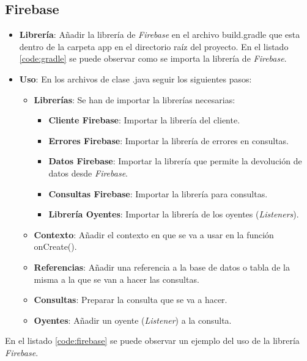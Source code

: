 	
	\newpage
	\subsection{Firebase}
	\begin{itemize}
		\item {\bf Librería}: Añadir la librería de {\it Firebase} en el archivo {\ttfamily build.gradle} que esta dentro de la carpeta {\ttfamily app} en el directorio raíz del proyecto. En el listado \ref{code:gradle} se puede observar como se importa la librería de {\it Firebase}.
		
		
		
		\item {\bf Uso}: En los archivos de clase {\ttfamily .java}\cite{14:java:online} seguir los siguientes pasos:
		\begin{itemize}
			\item {\bf Librerías}: Se han de importar la librerías necesarias:
			\begin{itemize}
				\item {\bf Cliente Firebase}: Importar la librería del cliente.
				\item {\bf Errores Firebase}: Importar la librería de errores en consultas.
				\item {\bf Datos Firebase}: Importar la librería que permite la devolución de datos desde {\it Firebase}.
				\item {\bf Consultas Firebase}: Importar la librería para consultas.
				\item {\bf Librería Oyentes}: Importar la librería de los oyentes ({\it Listeners}).
			\end{itemize}
			\item {\bf Contexto}: Añadir el contexto en que se va a usar en la función {\ttfamily onCreate()}.
			\item {\bf Referencias}: Añadir una referencia a la base de datos o tabla de la misma a la que se van a hacer las consultas.
			\item {\bf Consultas}: Preparar la consulta que se va a hacer.
			\item {\bf Oyentes}: Añadir un oyente ({\it Listener}) a la consulta.
		\end{itemize}
	\end{itemize}

	En el listado \ref{code:firebase} se puede observar un ejemplo del uso de la librería {\it Firebase}.
	
	